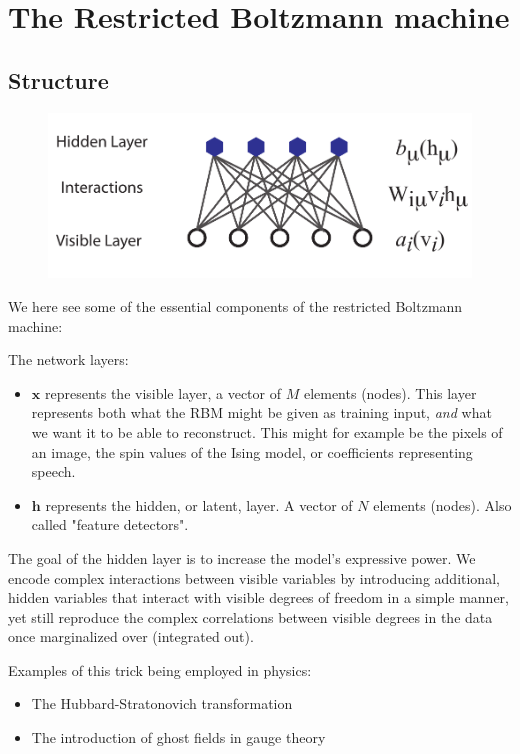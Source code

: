 \documentclass[norsk,a4paper,11pt]{beamer}
\begin{document}
\section{The Restricted Boltzmann machine}
\subsection{Structure}
\begin{frame}

\begin{figure}
    \includegraphics[width=0.9\linewidth]{RBM.pdf}
\end{figure}


We here see some of the essential components of the restricted Boltzmann machine:

The network layers:
\begin{itemize}
	\item $\bm{x}$ represents the visible layer, a vector of $M$ elements (nodes). This layer represents both what the RBM might be given as training input, \textit{and} what we want it to be able to reconstruct. This might for example be the pixels of an image, the spin values of the Ising model, or coefficients representing speech.
	\item $\bm{h}$ represents the hidden, or latent, layer. A vector of $N$ elements (nodes). Also called "feature detectors".
\end{itemize}
\end{frame}

\begin{frame}
The goal of the hidden layer is to increase the model's expressive power. We encode complex interactions between visible variables by introducing additional, hidden variables that interact with visible degrees of freedom in a simple manner, yet still reproduce the complex correlations between visible degrees in the data once marginalized over (integrated out).

Examples of this trick being employed in physics: 
\begin{itemize}
	\item The Hubbard-Stratonovich transformation
	\item The introduction of ghost fields in gauge theory
\end{itemize}
\end{frame}
\end{document}

